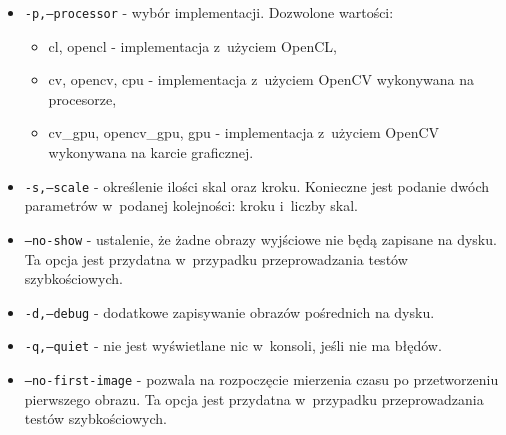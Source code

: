 \begin{itemize}
\item \texttt{-p,--processor} - wybór implementacji. Dozwolone wartości:
	\begin{itemize}
		\item cl, opencl - implementacja z~użyciem OpenCL,
        \item cv, opencv, cpu - implementacja z~użyciem OpenCV wykonywana na procesorze,
        \item cv\_gpu, opencv\_gpu, gpu - implementacja z~użyciem OpenCV wykonywana na karcie graficznej.
	\end{itemize}
\item \texttt{-s,--scale} - określenie ilości skal oraz kroku. Konieczne jest podanie dwóch parametrów w~podanej kolejności: kroku i~liczby skal.
\item \texttt{--no-show} - ustalenie, że żadne obrazy wyjściowe nie będą zapisane na dysku. Ta opcja jest przydatna w~przypadku przeprowadzania testów szybkościowych.
\item \texttt{-d,--debug} - dodatkowe zapisywanie obrazów pośrednich na dysku.
\item \texttt{-q,--quiet} - nie jest wyświetlane nic w~konsoli, jeśli nie ma błędów.
\item \texttt{--no-first-image} - pozwala na rozpoczęcie mierzenia czasu po przetworzeniu pierwszego obrazu. Ta opcja jest przydatna w~przypadku przeprowadzania testów szybkościowych.
\end{itemize}